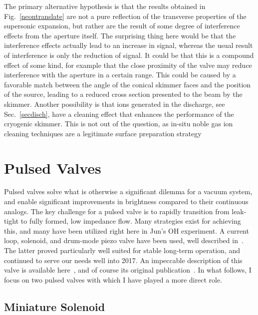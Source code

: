 The primary alternative hypothesis is that the results obtained in Fig.~\ref{neontranslate} are not a pure reflection of the transverse properties of the supersonic expansion, but rather are the result of some degree of interference effects from the aperture itself.
The surprising thing here would be that the interference effects actually lead to an increase in signal, whereas the usual result of interference is only the reduction of signal.
It could be that this is a compound effect of some kind, for example that the close proximity of the valve may reduce interference with the aperture in a certain range. 
This could be caused by a favorable match between the angle of the conical skimmer faces and the position of the source, leading to a reduced cross section presented to the beam by the skimmer.
Another possibility is that ions generated in the discharge, see Sec.~\ref{secdisch}, have a cleaning effect that enhances the performance of the cryogenic skimmer.
This is not out of the question, as in-situ noble gas ion cleaning techniques are a legitimate surface preparation strategy~\cite{Hite2012}

\section{Pulsed Valves}

Pulsed valves solve what is otherwise a significant dilemma for a vacuum system, and enable significant improvements in brightness compared to their continuous analogs.
The key challenge for a pulsed valve is to rapidly transition from leak-tight to fully formed, low impedance flow.
Many strategies exist for achieving this, and many have been utilized right here in Jun's OH experiment.
A current loop, solenoid, and drum-mode piezo valve have been used, well described in~\cite[Sec.~3.1.3.1-3]{SawyerThesis2010}.
The latter proved particularly well suited for stable long-term operation, and continued to serve our needs well into 2017.
An impeccable  description of this valve is available here~\citep[Sec.~3.4.1.1]{BrilesThesis2015}, and of course its original publication~\cite{Proch1989}.
In what follows, I focus on two pulsed valves with which I have played a more direct role.

\subsection{Miniature Solenoid}\label{evenvsec}

